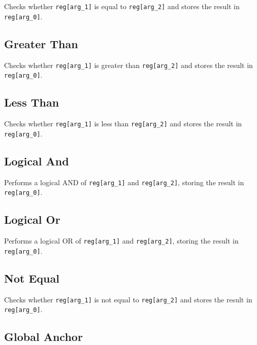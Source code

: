 
Checks whether \texttt{reg[arg\_1]} is equal to \texttt{reg[arg\_2]} and stores the result in \texttt{reg[arg\_0]}.

\subsection{Greater Than}


Checks whether \texttt{reg[arg\_1]} is greater than \texttt{reg[arg\_2]} and stores the result in \texttt{reg[arg\_0]}.

\subsection{Less Than}


Checks whether \texttt{reg[arg\_1]} is less than \texttt{reg[arg\_2]} and stores the result in \texttt{reg[arg\_0]}.

\subsection{Logical And}


Performs a logical AND of \texttt{reg[arg\_1]} and \texttt{reg[arg\_2]}, storing the result in \texttt{reg[arg\_0]}.

\subsection{Logical Or}


Performs a logical OR of \texttt{reg[arg\_1]} and \texttt{reg[arg\_2]}, storing the result in \texttt{reg[arg\_0]}.

\subsection{Not Equal}


Checks whether \texttt{reg[arg\_1]} is not equal to \texttt{reg[arg\_2]} and stores the result in \texttt{reg[arg\_0]}.

\subsection{Global Anchor} \label{sec:global_anchor}

